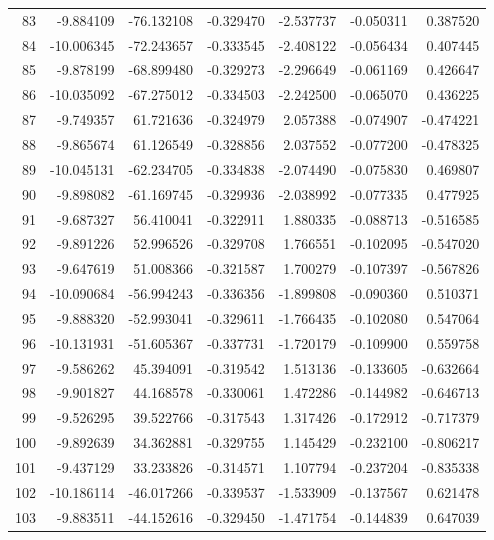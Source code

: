 \begin{tabular}{rrrrrrr}
 83 &  -9.884109 &  -76.132108 & -0.329470 &   -2.537737 &   -0.050311 &  0.387520 \\
 84 & -10.006345 &  -72.243657 & -0.333545 &   -2.408122 &   -0.056434 &  0.407445 \\
 85 &  -9.878199 &  -68.899480 & -0.329273 &   -2.296649 &   -0.061169 &  0.426647 \\
 86 & -10.035092 &  -67.275012 & -0.334503 &   -2.242500 &   -0.065070 &  0.436225 \\
 87 &  -9.749357 &   61.721636 & -0.324979 &    2.057388 &   -0.074907 & -0.474221 \\
 88 &  -9.865674 &   61.126549 & -0.328856 &    2.037552 &   -0.077200 & -0.478325 \\
 89 & -10.045131 &  -62.234705 & -0.334838 &   -2.074490 &   -0.075830 &  0.469807 \\
 90 &  -9.898082 &  -61.169745 & -0.329936 &   -2.038992 &   -0.077335 &  0.477925 \\
 91 &  -9.687327 &   56.410041 & -0.322911 &    1.880335 &   -0.088713 & -0.516585 \\
 92 &  -9.891226 &   52.996526 & -0.329708 &    1.766551 &   -0.102095 & -0.547020 \\
 93 &  -9.647619 &   51.008366 & -0.321587 &    1.700279 &   -0.107397 & -0.567826 \\
 94 & -10.090684 &  -56.994243 & -0.336356 &   -1.899808 &   -0.090360 &  0.510371 \\
 95 &  -9.888320 &  -52.993041 & -0.329611 &   -1.766435 &   -0.102080 &  0.547064 \\
 96 & -10.131931 &  -51.605367 & -0.337731 &   -1.720179 &   -0.109900 &  0.559758 \\
 97 &  -9.586262 &   45.394091 & -0.319542 &    1.513136 &   -0.133605 & -0.632664 \\
 98 &  -9.901827 &   44.168578 & -0.330061 &    1.472286 &   -0.144982 & -0.646713 \\
 99 &  -9.526295 &   39.522766 & -0.317543 &    1.317426 &   -0.172912 & -0.717379 \\
100 &  -9.892639 &   34.362881 & -0.329755 &    1.145429 &   -0.232100 & -0.806217 \\
101 &  -9.437129 &   33.233826 & -0.314571 &    1.107794 &   -0.237204 & -0.835338 \\
102 & -10.186114 &  -46.017266 & -0.339537 &   -1.533909 &   -0.137567 &  0.621478 \\
103 &  -9.883511 &  -44.152616 & -0.329450 &   -1.471754 &   -0.144839 &  0.647039 \\

\end{tabular}

